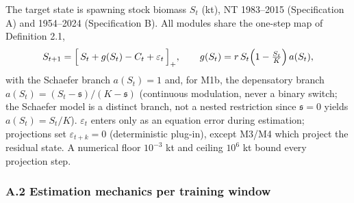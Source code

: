 \documentclass[11pt]{article}
\begin{document}
The target state is spawning stock biomass \(S_t\) (kt), NT 1983--2015
(Specification A) and 1954--2024 (Specification B). All modules share
the one-step map of Definition 2.1,
\[S_{t+1} = \Big[\, S_t + g(S_t) - C_t + \varepsilon_t \,\Big]_+, \qquad g(S_t) = r\, S_t \Bigl(1 - \tfrac{S_t}{K}\Bigr)\, a(S_t),\]
with the Schaefer branch \(a(S_t)=1\) and, for M1b, the depensatory
branch \(a(S_t)=(S_t - \mathfrak{s})/(K - \mathfrak{s})\) (continuous
modulation, never a binary switch; the Schaefer model is a distinct
branch, not a nested restriction since \(\mathfrak{s}=0\) yields
\(a(S_t)=S_t/K\)). \(\varepsilon_t\) enters only as an equation error
during estimation; projections set \(\varepsilon_{t+k}=0\)
(deterministic plug-in), except M3/M4 which project the residual state.
A numerical floor \(10^{-3}\) kt and ceiling \(10^{6}\) kt bound every
projection step.

\subsubsection{A.2 Estimation mechanics per training
window}\label{a.2-estimation-mechanics-per-training-window}
\end{document}
